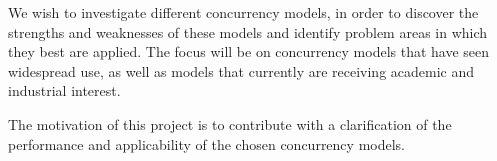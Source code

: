 We wish to investigate different concurrency models, in order to discover the strengths and weaknesses of these models and identify problem areas in which they best are applied. The focus will be on concurrency models that have seen widespread use, as well as models that currently are receiving academic and industrial interest.

The motivation of this project is to contribute with a clarification of the performance and applicability of the chosen concurrency models.


 
\worksheetend
